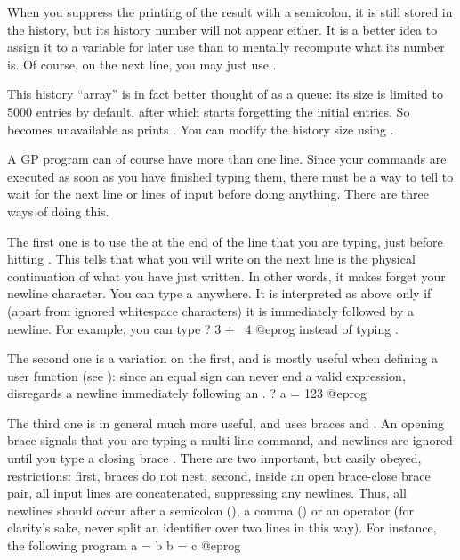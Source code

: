 When you suppress the printing of the result with a semicolon, it is still
stored in the history, but its history number will not appear either. It is a
better idea to assign it to a variable for later use than to mentally
recompute what its number is. Of course, on the next line, you may just use
\kbd{\%}.

This history ``array'' is in fact better thought of as a queue: its size is
limited to 5000 entries by default, after which  starts forgetting
the initial entries. So  becomes unavailable as  prints
. You can modify the history size using .

 A GP program
can of course have more than one line. Since your commands are executed as
soon as you have finished typing them, there must be a way to tell 
to wait for the next line or lines of input before doing anything. There are
three ways of doing this.

The first one is to use the  \kbd{\bs} at the end of
the line that you are typing, just before hitting . This tells
 that what you will write on the next line is the physical
continuation of what you have just written. In other words, it makes 
forget your newline character. You can type a \kbd{\bs} anywhere. It is
interpreted as above only if (apart from ignored whitespace characters) it is
immediately followed by a newline. For example, you can type
\bprog
? 3 + \
4
@eprog
\noindent instead of typing .

The second one is a variation on the first, and is mostly useful when
defining a user function (see \secref{se:user_defined}): since an equal sign
can never end a valid expression, \kbd{gp} disregards a newline immediately
following an \kbd{=}.
\bprog
? a =
123
@eprog

The third one is in general much more useful, and uses braces \kbd{\obr} and
\kbd{\cbr}.\sidx{brace characters} An opening brace \kbd{\obr} signals that
you are typing a multi-line command, and newlines are ignored until you type
a closing brace \kbd{\cbr}. There are two important, but easily obeyed,
restrictions: first, braces do not nest; second, inside an open brace-close
brace pair, all input lines are concatenated, suppressing any newlines. Thus,
all newlines should occur after a semicolon (\kbd{;}), a comma (\kbd{,}) or
an operator (for clarity's sake, never split an identifier over two lines in
this way). For instance, the following program
\bprog
{
  a = b
  b = c
}
@eprog

